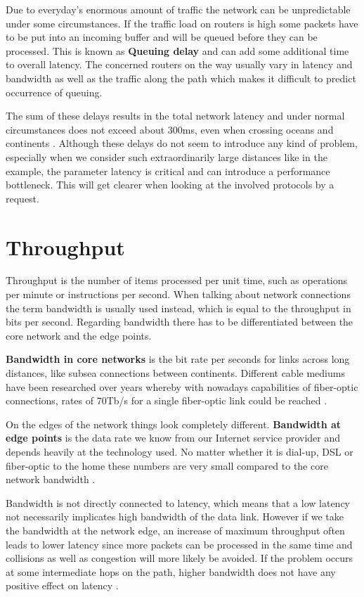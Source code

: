 Due to everyday's enormous amount of traffic the network can be unpredictable under some circumstances. If the traffic load on routers is high some packets have to be put into an incoming buffer and will be queued before they can be processed. This is known as \textbf{Queuing delay} and can add some additional time to overall latency. The concerned routers on the way usually vary in latency and bandwidth as well as the traffic along the path which makes it difficult to predict occurrence of queuing.   

The sum of these delays results in the total network latency and under normal circumstances does not exceed about 300ms, even when crossing oceans and continents \cite{Grigorik_2013}. Although these delays do not seem to introduce any kind of problem, especially when we consider such extraordinarily large distances like in the example, the parameter latency is critical and can introduce a performance bottleneck. This will get clearer when looking at the involved protocols by a request.

\section{Throughput}
Throughput is the number of items processed per unit time, such as operations per minute or instructions per second. When talking about network connections the term bandwidth is usually used instead, which is equal to the throughput in bits per second. 
Regarding bandwidth there has to be differentiated between the core network and the edge points. 

\textbf{Bandwidth in core networks} is the bit rate per seconds for links across long distances, like subsea connections between continents. Different cable mediums have been researched over years whereby with nowadays capabilities of fiber-optic connections, rates of 70Tb/s for a single fiber-optic link could be reached \cite{Grigorik_2013}. 

On the edges of the network things look completely different. \textbf{Bandwidth at edge points} is the data rate we know from our Internet service provider and depends heavily at the technology used. No matter whether it is dial-up, DSL or fiber-optic to the home these numbers are very small compared to the core network bandwidth  \cite{Grigorik_2013}.

Bandwidth is not directly connected to latency, which means that a low latency not necessarily implicates high bandwidth of the data link. However if we take the bandwidth at the network edge, an increase of maximum throughput often leads to lower latency since more packets can be processed in the same time and collisions as well as congestion will more likely be avoided. If the problem occurs at some intermediate hops on the path, higher bandwidth does not have any positive effect on latency \cite{Killelea_2002}.

